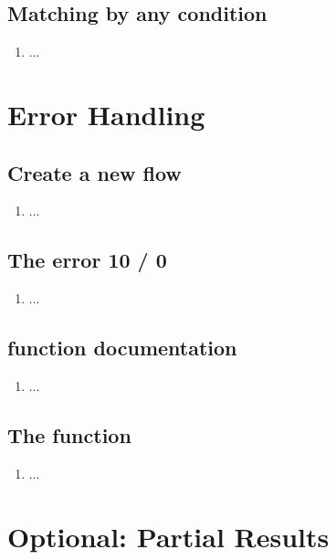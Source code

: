 \subsection{Matching by any condition}
\begin{enumerate}[resume*]
\item ...
\end{enumerate}


\section{Error Handling}

\subsection{Create a new flow}
\begin{enumerate}
\item ...
\end{enumerate}

\subsection{The error 10 / 0}
\begin{enumerate}[resume*]
\item ...
\end{enumerate}

\subsection{ function documentation}
\begin{enumerate}[resume*]
\item ...
\end{enumerate}

\subsection{The  function}
\begin{enumerate}[resume*]
\item ...
\end{enumerate}


\section{Optional: Partial Results}
